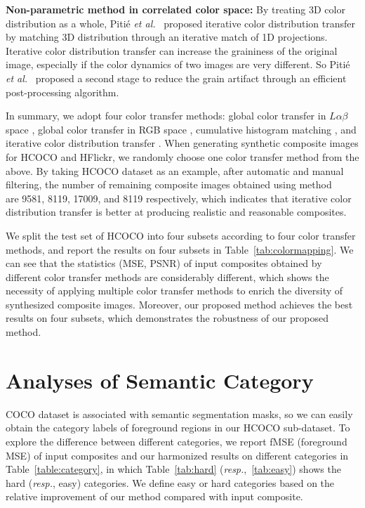 \documentclass[10pt,twocolumn,letterpaper]{article}
\begin{document}
\textbf{Non-parametric method in correlated color space: }By treating 3D color distribution as a whole, Pitié \textit{et al.}~\cite{Pitie2005ndimensionalsupp} proposed iterative color distribution transfer by matching 3D distribution through an iterative match of 1D projections. Iterative color distribution transfer can increase the graininess of the original image, especially if the color dynamics of two images are very different. So Pitié \textit{et al.}~\cite{pitie2007automatedsupp} proposed a second stage to reduce the grain artifact through an efficient post-processing algorithm.


In summary, we adopt four color transfer methods: global color transfer in $L\alpha\beta$ space \cite{reinhard2001colorsupp}, global color transfer in RGB space \cite{xiao2006colorsupp}, cumulative histogram matching \cite{fecker2008histogramsupp}, and iterative color distribution transfer \cite{pitie2007automatedsupp}. When generating synthetic composite images for HCOCO and HFlickr, we randomly choose one color transfer method from the above.
By taking HCOCO dataset as an example, after automatic and manual filtering, the number of remaining composite images obtained using method~\cite{reinhard2001colorsupp}~\cite{xiao2006colorsupp}~\cite{pitie2007automatedsupp}~\cite{fecker2008histogramsupp} are 9581, 8119, 17009, and 8119 respectively, which indicates that iterative color distribution transfer \cite{pitie2007automatedsupp} is better at producing realistic and reasonable composites. 

We split the test set of HCOCO into four subsets according to four color transfer methods, and report the results on four subsets in Table~\ref{tab:colormapping}. We can see that the statistics (MSE, PSNR) of input composites obtained by different color transfer methods are considerably different, which shows the necessity of applying multiple color transfer methods to enrich the diversity of synthesized composite images. Moreover, our proposed method achieves the best results on four subsets, which demonstrates the robustness of our proposed method.

\section{Analyses of Semantic Category} \label{sec:category}


COCO dataset is associated with semantic segmentation masks, so we can easily obtain the category labels of foreground regions in our HCOCO sub-dataset. To explore the difference between different categories, we report fMSE (foreground MSE) of input composites and our harmonized results on different categories in Table~\ref{table:category}, in which Table~\ref{tab:hard} (\emph{resp.},~\ref{tab:easy}) shows the hard (\emph{resp.}, easy) categories. We define easy or hard categories based on the relative improvement of our method compared with input composite.
\end{document}
